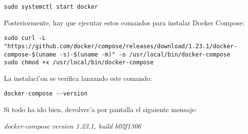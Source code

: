 \begin{lstlisting}
sudo systemctl start docker
\end{lstlisting}

Posteriormente, hay que ejecutar estos comandos para instalar Docker Compose:

\begin{lstlisting}
sudo curl -L "https://github.com/docker/compose/releases/download/1.23.1/docker-compose-$(uname -s)-$(uname -m)" -o /usr/local/bin/docker-compose
sudo chmod +x /usr/local/bin/docker-compose
\end{lstlisting}


La instalaci'on se verifica lanzando este comando:
\begin{lstlisting}
docker-compose --version
\end{lstlisting}

Si todo ha ido bien, devolver'a por pantalla el siguiente mensaje:
\begin{center}
\textit{docker-compose version 1.23.1, build b02f1306}
\end{center}






